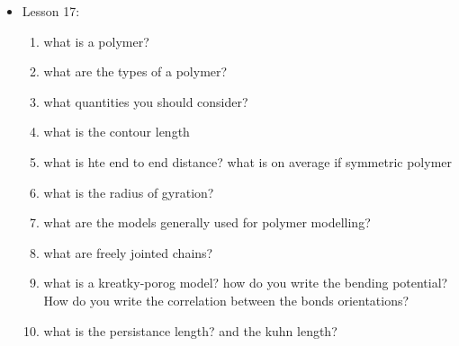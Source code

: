 {\begin{itemize}
    \begin{enumerate}
        \item what does the Anfisen experiment tell us?
        \item what is the protein folding funnell?
        \item why to use CG?
        \item what type of approaches are available?
        \item what models are available?
        \item what is a lattice model?
        \item which types protein models exist?
        \item what is a martini model?
        \item what is a go model?
        \item what is inferred by saying that proteins are conformationally selected by ligands?
        \item How is the vibrational nature of proteins involved?
        \item what is a elastic network model?
        \item What are modes?
        \item how can you evaluate slow modes in ENMs?
        \item what are quasi-rigid domain description models?
    \end{enumerate}
    \item Lesson 17:
    \begin{enumerate}
        \item what is a polymer?
        \item what are the types of a polymer?
        \item what quantities you should consider?
        \item what is the contour length
        \item what is hte end to end distance? what is on average if symmetric polymer
        \item what is the radius of gyration?
        \item what are the models generally used for polymer modelling?
        \item what are freely jointed chains?
        \item what is a kreatky-porog model? how do you write the bending potential? How do you write the correlation between the bonds orientations?
        \item what is the persistance length? and the kuhn length?

\end{enumerate}
\end{itemize}}

